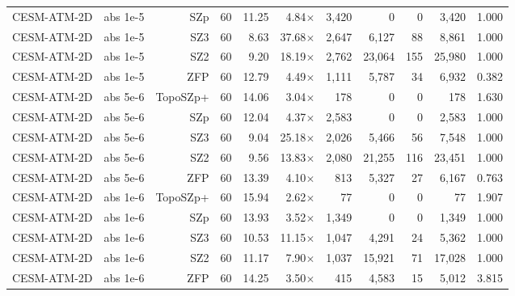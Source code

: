 \begin{tabular}{lrrrrrrrrrr}
CESM-ATM-2D & abs 1e-5 & SZp & 60 & 11.25 & 4.84$\times$ & 3,420 & 0 & 0 & 3,420 & 1.000 \\
CESM-ATM-2D & abs 1e-5 & SZ3 & 60 & 8.63 & 37.68$\times$ & 2,647 & 6,127 & 88 & 8,861 & 1.000 \\
CESM-ATM-2D & abs 1e-5 & SZ2 & 60 & 9.20 & 18.19$\times$ & 2,762 & 23,064 & 155 & 25,980 & 1.000 \\
CESM-ATM-2D & abs 1e-5 & ZFP & 60 & 12.79 & 4.49$\times$ & 1,111 & 5,787 & 34 & 6,932 & 0.382 \\
CESM-ATM-2D & abs 5e-6 & TopoSZp+ & 60 & 14.06 & 3.04$\times$ & 178 & 0 & 0 & 178 & 1.630 \\
CESM-ATM-2D & abs 5e-6 & SZp & 60 & 12.04 & 4.37$\times$ & 2,583 & 0 & 0 & 2,583 & 1.000 \\
CESM-ATM-2D & abs 5e-6 & SZ3 & 60 & 9.04 & 25.18$\times$ & 2,026 & 5,466 & 56 & 7,548 & 1.000 \\
CESM-ATM-2D & abs 5e-6 & SZ2 & 60 & 9.56 & 13.83$\times$ & 2,080 & 21,255 & 116 & 23,451 & 1.000 \\
CESM-ATM-2D & abs 5e-6 & ZFP & 60 & 13.39 & 4.10$\times$ & 813 & 5,327 & 27 & 6,167 & 0.763 \\
CESM-ATM-2D & abs 1e-6 & TopoSZp+ & 60 & 15.94 & 2.62$\times$ & 77 & 0 & 0 & 77 & 1.907 \\
CESM-ATM-2D & abs 1e-6 & SZp & 60 & 13.93 & 3.52$\times$ & 1,349 & 0 & 0 & 1,349 & 1.000 \\
CESM-ATM-2D & abs 1e-6 & SZ3 & 60 & 10.53 & 11.15$\times$ & 1,047 & 4,291 & 24 & 5,362 & 1.000 \\
CESM-ATM-2D & abs 1e-6 & SZ2 & 60 & 11.17 & 7.90$\times$ & 1,037 & 15,921 & 71 & 17,028 & 1.000 \\
CESM-ATM-2D & abs 1e-6 & ZFP & 60 & 14.25 & 3.50$\times$ & 415 & 4,583 & 15 & 5,012 & 3.815 \\
\bottomrule
\end{tabular}

